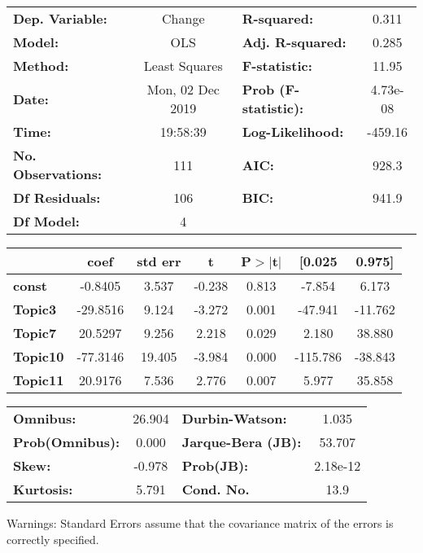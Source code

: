 \documentclass{article}
\begin{document}
 
\begin{table}
\begin{center}
\begin{tabular}{lclc}
\toprule
\textbf{Dep. Variable:}    &      Change      & \textbf{  R-squared:         } &     0.311   \\
\textbf{Model:}            &       OLS        & \textbf{  Adj. R-squared:    } &     0.285   \\
\textbf{Method:}           &  Least Squares   & \textbf{  F-statistic:       } &     11.95   \\
\textbf{Date:}             & Mon, 02 Dec 2019 & \textbf{  Prob (F-statistic):} &  4.73e-08   \\
\textbf{Time:}             &     19:58:39     & \textbf{  Log-Likelihood:    } &   -459.16   \\
\textbf{No. Observations:} &         111      & \textbf{  AIC:               } &     928.3   \\
\textbf{Df Residuals:}     &         106      & \textbf{  BIC:               } &     941.9   \\
\textbf{Df Model:}         &           4      & \textbf{                     } &             \\
\bottomrule
\end{tabular}
\begin{tabular}{lcccccc}
                 & \textbf{coef} & \textbf{std err} & \textbf{t} & \textbf{P$> |$t$|$} & \textbf{[0.025} & \textbf{0.975]}  \\
\midrule
\textbf{const}   &      -0.8405  &        3.537     &    -0.238  &         0.813        &       -7.854    &        6.173     \\
\textbf{Topic3}  &     -29.8516  &        9.124     &    -3.272  &         0.001        &      -47.941    &      -11.762     \\
\textbf{Topic7}  &      20.5297  &        9.256     &     2.218  &         0.029        &        2.180    &       38.880     \\
\textbf{Topic10} &     -77.3146  &       19.405     &    -3.984  &         0.000        &     -115.786    &      -38.843     \\
\textbf{Topic11} &      20.9176  &        7.536     &     2.776  &         0.007        &        5.977    &       35.858     \\
\bottomrule
\end{tabular}
\begin{tabular}{lclc}
\textbf{Omnibus:}       & 26.904 & \textbf{  Durbin-Watson:     } &    1.035  \\
\textbf{Prob(Omnibus):} &  0.000 & \textbf{  Jarque-Bera (JB):  } &   53.707  \\
\textbf{Skew:}          & -0.978 & \textbf{  Prob(JB):          } & 2.18e-12  \\
\textbf{Kurtosis:}      &  5.791 & \textbf{  Cond. No.          } &     13.9  \\
\bottomrule
\end{tabular}
\end{center}

Warnings: \newline
 [1] Standard Errors assume that the covariance matrix of the errors is correctly specified.
\end{table} 
\end{document}
